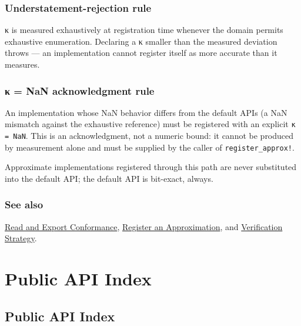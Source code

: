 \subsection{Understatement-rejection rule}



\label{10633883490468249847}{}


κ is measured exhaustively at registration time whenever the domain permits exhaustive enumeration. Declaring a κ smaller than the measured deviation throws — an implementation cannot register itself as more accurate than it measures.



\subsection{κ = NaN acknowledgment rule}



\label{17355671808123045861}{}


An implementation whose NaN behavior differs from the default API{\textquotesingle}s (a NaN mismatch against the exhaustive reference) must be registered with an explicit \texttt{κ = NaN}. This is an acknowledgment, not a numeric bound: it cannot be produced by measurement alone and must be supplied by the caller of \texttt{register\_\allowbreak{}approx!}.



Approximate implementations registered through this path are never substituted into the default API; the default API is bit-exact, always.



\subsection{See also}



\label{292862844209942199-dup15}{}


\href{workflow\_\allowbreak{}conformance.md}{Read and Export Conformance}, \href{workflow\_\allowbreak{}approximation.md}{Register an Approximation}, and \href{internals\_\allowbreak{}verification.md}{Verification Strategy}.



\chapter{Public API Index}


\section{Public API Index}



